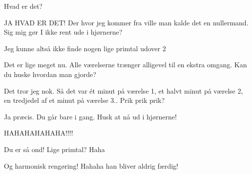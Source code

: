\documentclass[a4paper,11pt]{article}
\begin{document}
\begin{sketch}
 Hvad er det?

 JA HVAD ER DET! Der hvor jeg kommer fra ville man kalde det en nullermand. Sig mig gør I ikke rent ude i hjørnerne?


 Jeg kunne altså ikke finde nogen lige primtal udover 2


 Det er lige meget nu. Alle værelserne trænger alligevel til en ekstra omgang. Kan du huske hvordan man gjorde?

 Det tror jeg nok. Så det var ét minut på værelse 1, et halvt minut på værelse 2, en tredjedel af et minut på værelse 3.. Prik prik prik?


 Ja præcis. Du går bare i gang. Husk at nå ud i hjørnerne!


 HAHAHAHAHAHA!!!!

 Du er så ond! Lige primtal? Haha

 Og harmonisk rengøring! Hahaha han bliver aldrig færdig!

\end{sketch}
\end{document}
